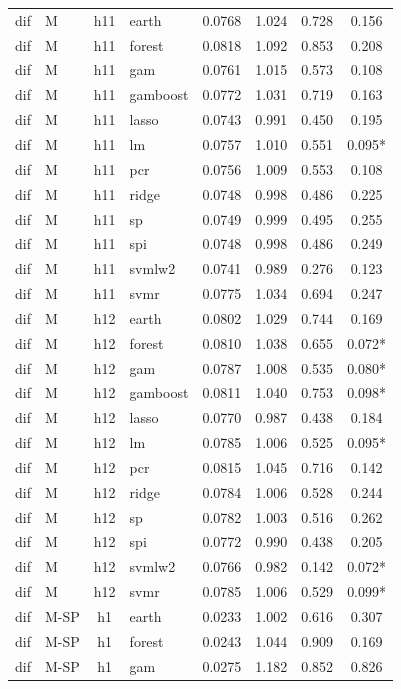 \begin{ThreePartTable}
\begin{longtable}[t]{llclcccc}
\addlinespace
dif & M & h11 & earth & 0.0768 & 1.024 & 0.728 & 0.156\\
dif & M & h11 & forest & 0.0818 & 1.092 & 0.853 & 0.208\\
dif & M & h11 & gam & 0.0761 & 1.015 & 0.573 & 0.108\\
dif & M & h11 & gamboost & 0.0772 & 1.031 & 0.719 & 0.163\\
dif & M & h11 & lasso & 0.0743 & 0.991 & 0.450 & 0.195\\
dif & M & h11 & lm & 0.0757 & 1.010 & 0.551 & 0.095*\\
dif & M & h11 & pcr & 0.0756 & 1.009 & 0.553 & 0.108\\
dif & M & h11 & ridge & 0.0748 & 0.998 & 0.486 & 0.225\\
dif & M & h11 & sp & 0.0749 & 0.999 & 0.495 & 0.255\\
dif & M & h11 & spi & 0.0748 & 0.998 & 0.486 & 0.249\\
dif & M & h11 & svmlw2 & 0.0741 & 0.989 & 0.276 & 0.123\\
dif & M & h11 & svmr & 0.0775 & 1.034 & 0.694 & 0.247\\
\addlinespace
dif & M & h12 & earth & 0.0802 & 1.029 & 0.744 & 0.169\\
dif & M & h12 & forest & 0.0810 & 1.038 & 0.655 & 0.072*\\
dif & M & h12 & gam & 0.0787 & 1.008 & 0.535 & 0.080*\\
dif & M & h12 & gamboost & 0.0811 & 1.040 & 0.753 & 0.098*\\
dif & M & h12 & lasso & 0.0770 & 0.987 & 0.438 & 0.184\\
dif & M & h12 & lm & 0.0785 & 1.006 & 0.525 & 0.095*\\
dif & M & h12 & pcr & 0.0815 & 1.045 & 0.716 & 0.142\\
dif & M & h12 & ridge & 0.0784 & 1.006 & 0.528 & 0.244\\
dif & M & h12 & sp & 0.0782 & 1.003 & 0.516 & 0.262\\
dif & M & h12 & spi & 0.0772 & 0.990 & 0.438 & 0.205\\
dif & M & h12 & svmlw2 & 0.0766 & 0.982 & 0.142 & 0.072*\\
dif & M & h12 & svmr & 0.0785 & 1.006 & 0.529 & 0.099*\\
\addlinespace
dif & M-SP & h1 & earth & 0.0233 & 1.002 & 0.616 & 0.307\\
dif & M-SP & h1 & forest & 0.0243 & 1.044 & 0.909 & 0.169\\
dif & M-SP & h1 & gam & 0.0275 & 1.182 & 0.852 & 0.826\\

\end{longtable}
\end{ThreePartTable}
